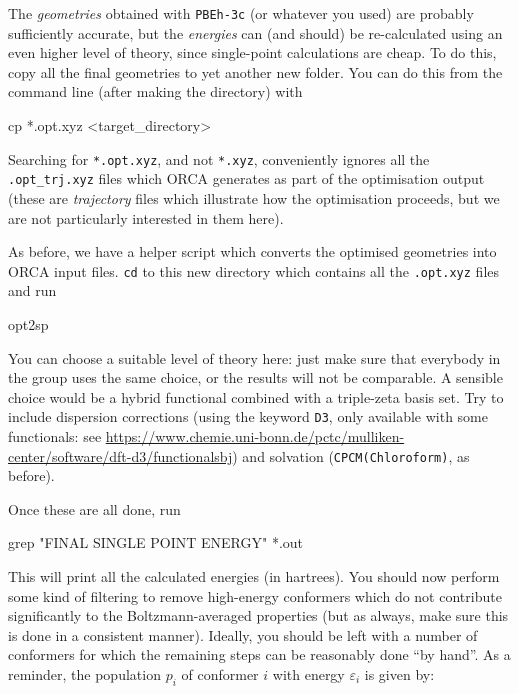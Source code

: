 \documentclass[10pt]{article}
\begin{document}
The \textit{geometries} obtained with \texttt{PBEh-3c} (or whatever you used) are probably sufficiently accurate, but the \textit{energies} can (and should) be re-calculated using an even higher level of theory, since single-point calculations are cheap. To do this, copy all the final geometries to yet another new folder. You can do this from the command line (after making the directory) with

\begin{cmdline}
cp *.opt.xyz <target_directory>
\end{cmdline}

Searching for \texttt{*.opt.xyz}, and not \texttt{*.xyz}, conveniently ignores all the \texttt{.opt\_trj.xyz} files which ORCA generates as part of the optimisation output (these are \textit{trajectory} files which illustrate how the optimisation proceeds, but we are not particularly interested in them here).

As before, we have a helper script which converts the optimised geometries into ORCA input files. \texttt{cd} to this new directory which contains all the \texttt{.opt.xyz} files and run

\begin{cmdline}
opt2sp
\end{cmdline}

You can choose a suitable level of theory here: just make sure that everybody in the group uses the same choice, or the results will not be comparable. A sensible choice would be a hybrid functional combined with a triple-zeta basis set. Try to include dispersion corrections (using the keyword \texttt{D3}, only available with some functionals: see \url{https://www.chemie.uni-bonn.de/pctc/mulliken-center/software/dft-d3/functionalsbj}) and solvation (\texttt{CPCM(Chloroform)}, as before).

Once these are all done, run

\begin{cmdline}
grep "FINAL SINGLE POINT ENERGY" *.out
\end{cmdline}

This will print all the calculated energies (in hartrees). You should now perform some kind of filtering to remove high-energy conformers which do not contribute significantly to the Boltzmann-averaged properties (but as always, make sure this is done in a consistent manner). Ideally, you should be left with a number of conformers for which the remaining steps can be reasonably done ``by hand''. As a reminder, the population \(p_i\) of conformer \(i\) with energy \(\varepsilon_i\) is given by:
\end{document}
